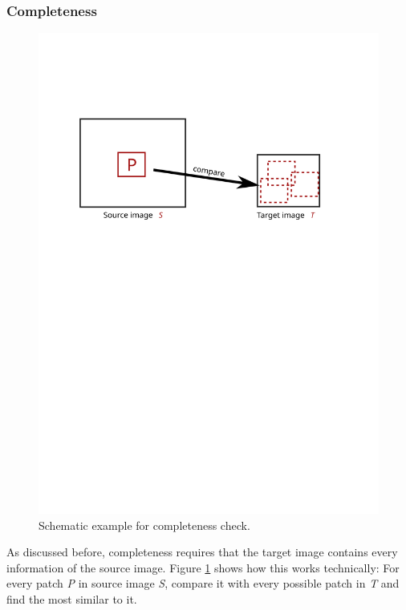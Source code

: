 \subsubsection*{Completeness}
\begin{figure}[h]
\centering
\includegraphics[scale=0.65]{img/completeness}
\caption[Completenesse]{Schematic example for completeness check.}
\label{fig:Completeness}
\end{figure}

As discussed before, completeness requires that the target image contains every information of the source image. Figure \ref{fig:Completeness} shows how this works technically: For every patch \textit{P} in source image \textit{S}, compare it with every possible patch in \textit{T} and find the most similar to it.


